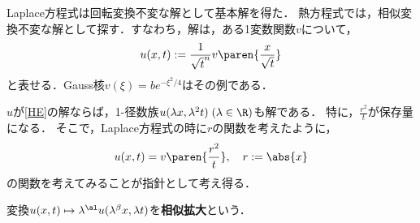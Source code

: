 \documentclass[uplatex,dvipdfmx]{jsreport}
\begin{document}
\begin{tcolorbox}[colframe=ForestGreen, colback=ForestGreen!10!white,breakable,colbacktitle=ForestGreen!40!white,coltitle=black,fonttitle=\bfseries\sffamily,
title=]
    Laplace方程式は回転変換不変な解として基本解を得た．
    熱方程式では，相似変換不変な解として探す．すなわち，解は，ある1変数関数$v$について，
    \[u(x,t):=\frac{1}{\sqrt{t}^n}v\paren{\frac{x}{\sqrt{t}}}\]
    と表せる．Gauss核$v(\xi)=be^{-\xi^2/4}$はその例である．
\end{tcolorbox}

\begin{observation}[相似変換不変性への注目]
    $u$が\ref{HE}の解ならば，1-径数族$u(\lambda x,\lambda^2t)\;(\lambda\in\R)$も解である．
    特に，$\frac{r^2}{t}$が保存量になる．
    そこで，Laplace方程式の時に$r$の関数を考えたように，
    \[u(x,t)=v\paren{\frac{r^2}{t}},\quad r:=\abs{x}\]
    の関数を考えてみることが指針として考え得る．
\end{observation}

\begin{definition}
    変換$u(x,t)\mapsto\lambda^\al u(\lambda^\beta x,\lambda t)$を\textbf{相似拡大}という．
\end{definition}
\end{document}
